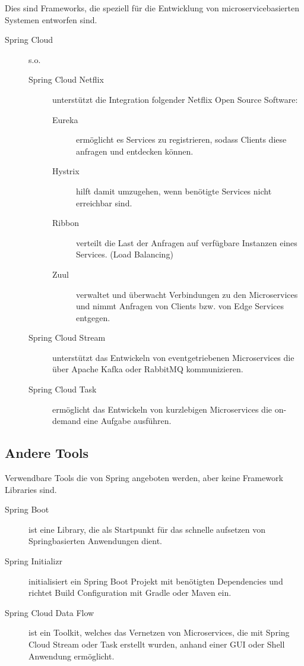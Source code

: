 \documentclass{article}
\begin{document}
Dies sind Frameworks, die speziell für die Entwicklung von microservicebasierten Systemen entworfen sind.

\begin{description}
    \item[Spring Cloud] s.o.
    \begin{description}
        \item[Spring Cloud Netflix] unterstützt die Integration folgender Netflix Open Source Software:
        \begin{description}
            \item[Eureka] ermöglicht es Services zu registrieren, sodass Clients diese anfragen und entdecken können.
            \item[Hystrix] hilft damit umzugehen, wenn benötigte Services nicht erreichbar sind.
            \item[Ribbon] verteilt die Last der Anfragen auf verfügbare Instanzen eines Services. (Load Balancing)
            \item[Zuul] verwaltet und überwacht Verbindungen zu den Microservices und nimmt Anfragen von Clients bzw. von Edge Services entgegen.
        \end{description}

        \item[Spring Cloud Stream] unterstützt das Entwickeln von eventgetriebenen Microservices die über Apache Kafka oder RabbitMQ kommunizieren.
        \item[Spring Cloud Task] ermöglicht das Entwickeln von kurzlebigen Microservices die on-demand eine Aufgabe ausführen.
    \end{description}
\end{description}

\subsection{Andere Tools}

Verwendbare Tools die von Spring angeboten werden, aber keine Framework Libraries sind.

\begin{description}
    \item[Spring Boot] ist eine Library, die als Startpunkt für das schnelle aufsetzen von Springbasierten Anwendungen dient.
    \item[Spring Initializr] initialisiert ein Spring Boot Projekt mit benötigten Dependencies und richtet Build Configuration mit Gradle oder Maven ein.
    \item[Spring Cloud Data Flow] ist ein Toolkit, welches das Vernetzen von Microservices, die mit Spring Cloud Stream oder Task erstellt wurden, anhand einer GUI oder Shell Anwendung ermöglicht.
\end{description}
\end{document}
